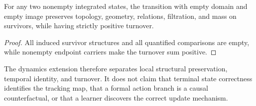 \begin{proposition}
For any two nonempty integrated states, the transition with empty domain and
empty image preserves topology, geometry, relations, filtration, and mass on
survivors, while having strictly positive turnover.
\end{proposition}

\begin{proof}
All induced survivor structures and all quantified comparisons are empty, while
nonempty endpoint carriers make the turnover sum positive.
\end{proof}

The dynamics extension therefore separates local structural preservation,
temporal identity, and turnover. It does not claim that terminal state
correctness identifies the tracking map, that a formal action branch is a causal
counterfactual, or that a learner discovers the correct update mechanism.
